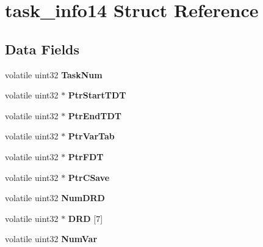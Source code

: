 \hypertarget{structtask__info14}{}\section{task\+\_\+info14 Struct Reference}
\label{structtask__info14}
\subsection*{Data Fields}
\begin{DoxyCompactItemize}
\item 
\mbox{\label{structtask__info14_aae864d527dd003626dc726ecf9c0734a}} 
volatile uint32 {\bfseries Task\+Num}
\item 
\mbox{\label{structtask__info14_a6afa198f3d3cd7ecf2b28abf2f9c28d3}} 
volatile uint32 $\ast$ {\bfseries Ptr\+Start\+T\+DT}
\item 
\mbox{\label{structtask__info14_a3ba9d9c5133c0c6ff1d6f503b2ae5f0f}} 
volatile uint32 $\ast$ {\bfseries Ptr\+End\+T\+DT}
\item 
\mbox{\label{structtask__info14_aa560be0f7189bb606fd775f7d29387c8}} 
volatile uint32 $\ast$ {\bfseries Ptr\+Var\+Tab}
\item 
\mbox{\label{structtask__info14_a275d86a4c7fbe17a326bba70009bfb00}} 
volatile uint32 $\ast$ {\bfseries Ptr\+F\+DT}
\item 
\mbox{\label{structtask__info14_a891ffbe2aae51216d6a39da3f30e1f6a}} 
volatile uint32 $\ast$ {\bfseries Ptr\+C\+Save}
\item 
\mbox{\label{structtask__info14_affee310ef1a0a619e9dd1fb1c33a3507}} 
volatile uint32 {\bfseries Num\+D\+RD}
\item 
\mbox{\label{structtask__info14_a450e389b9a5290bfde4f4719b31d0865}} 
volatile uint32 $\ast$ {\bfseries D\+RD} \mbox{[}7\mbox{]}
\item 
\mbox{\label{structtask__info14_a6c8adaa4ef0029b64a0785b968e32c6a}} 
volatile uint32 {\bfseries Num\+Var}

\end{DoxyCompactItemize}
